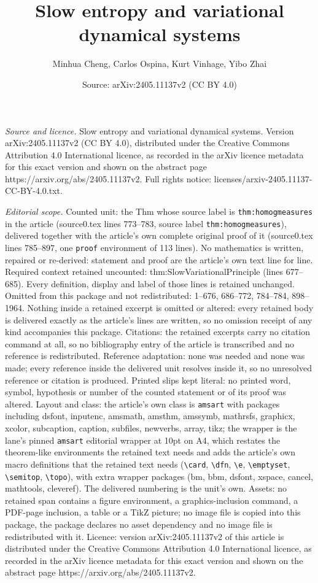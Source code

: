 \documentclass[10pt,a4paper]{amsart}
\title[Slow entropy and variational dynamical systems]{Slow entropy and variational dynamical systems}
\author{Minhua Cheng, Carlos Ospina, Kurt Vinhage, Yibo Zhai}
\date{Source: arXiv:2405.11137v2 (CC BY 4.0)}
\begin{document}
\maketitle

\noindent\emph{Source and licence.} Slow entropy and variational dynamical systems. Version arXiv:2405.11137v2 (CC BY 4.0), distributed under the Creative Commons Attribution 4.0 International licence, as recorded in the arXiv licence metadata for this exact version and shown on the abstract page https://arxiv.org/abs/2405.11137v2. Full rights notice: licenses/arxiv-2405.11137-CC-BY-4.0.txt.\par\smallskip

\noindent\textit{Editorial scope.} Counted unit: the Thm whose source label is \texttt{thm:homogmeasures} in the article (source0.tex lines 773--783, source label \texttt{thm:homogmeasures}), delivered together with the article's own complete original proof of it (source0.tex lines 785--897, one \texttt{proof} environment of 113 lines). No mathematics is written, repaired or re-derived: statement and proof are the article's own text line for line. Required context retained uncounted: thm:SlowVariationalPrinciple (lines 677--685). Every definition, display and label of those lines is retained unchanged. Omitted from this package and not redistributed: 1--676, 686--772, 784--784, 898--1964. Nothing inside a retained excerpt is omitted or altered: every retained body is delivered exactly as the article's lines are written, so no omission receipt of any kind accompanies this package. Citations: the retained excerpts carry no citation command at all, so no bibliography entry of the article is transcribed and no reference is redistributed. Reference adaptation: none was needed and none was made; every reference inside the delivered unit resolves inside it, so no unresolved reference or citation is produced. Printed slips kept literal: no printed word, symbol, hypothesis or number of the counted statement or of its proof was altered. Layout and class: the article's own class is \texttt{amsart} with packages including dsfont, inputenc, amsmath, amsthm, amssymb, mathrsfs, graphicx, xcolor, subcaption, caption, subfiles, newverbs, array, tikz; the wrapper is the lane's pinned \texttt{amsart} editorial wrapper at 10pt on A4, which restates the theorem-like environments the retained text needs and adds the article's own macro definitions that the retained text needs (\texttt{\textbackslash card}, \texttt{\textbackslash dfn}, \texttt{\textbackslash e}, \texttt{\textbackslash emptyset}, \texttt{\textbackslash semitop}, \texttt{\textbackslash topo}), with extra wrapper packages (bm, bbm, dsfont, xspace, cancel, mathtools, cleveref). The delivered numbering is the unit's own. Assets: no retained span contains a figure environment, a graphics-inclusion command, a PDF-page inclusion, a table or a TikZ picture; no image file is copied into this package, the package declares no asset dependency and no image file is redistributed with it. Licence: version arXiv:2405.11137v2 of this article is distributed under the Creative Commons Attribution 4.0 International licence, as recorded in the arXiv licence metadata for this exact version and shown on the abstract page https://arxiv.org/abs/2405.11137v2. 
\end{document}
